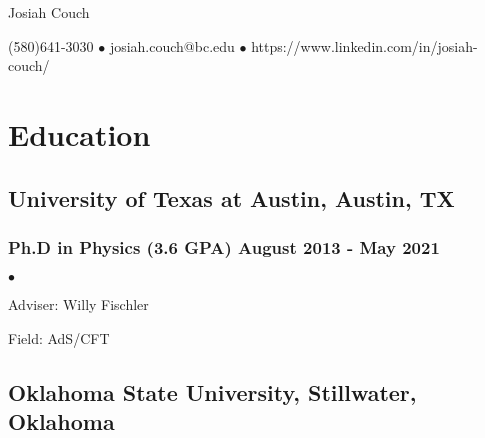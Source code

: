 \documentclass[letterpaper]{article}
\def\name{Josiah Couch}
\renewenvironment{itemize}{
  \begin{list}{$\bullet$}{
    \setlength{\itemsep}{0em}
    \setlength{\parskip}{0em}
    \setlength{\parsep}{0em} 
    \setlength{\topsep}{0em} 
  }
}{
  \end{list}
}
\begin{document}

\centerline{\LARGE \name}

\begin{center}

\small{(580)641-3030 $\bullet$ josiah.couch@bc.edu $\bullet$ https://www.linkedin.com/in/josiah-couch/}

\end{center}








\section*{Education}

\subsection*{University of Texas at Austin, Austin, TX}
\subsubsection*{Ph.D in Physics (3.6 GPA) \hfill August 2013 - May 2021}

\begin{itemize}
\item Adviser: Willy Fischler
\item Field: AdS/CFT
\end{itemize}

\subsection*{Oklahoma State University, Stillwater, Oklahoma}
\end{document}
